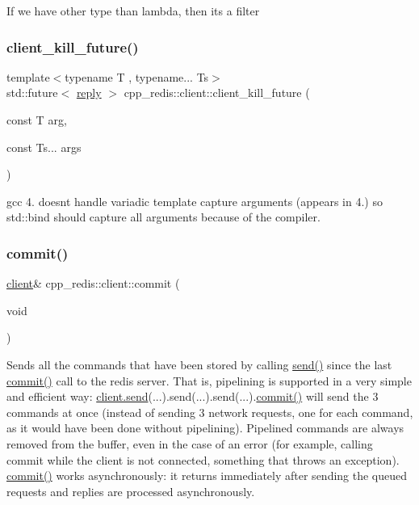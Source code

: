 If we have other type than lambda, then it\textquotesingle{}s a filter \mbox{\label{classcpp__redis_1_1client_ae6f09b6c022c910b79fb90a47291f511}} 
\subsubsection{\texorpdfstring{client\+\_\+kill\+\_\+future()}{client\_kill\_future()}}
{\footnotesize\ttfamily template$<$typename T , typename... Ts$>$ \\
std\+::future$<$ \hyperlink{classcpp__redis_1_1reply}{reply} $>$ cpp\+\_\+redis\+::client\+::client\+\_\+kill\+\_\+future (\begin{DoxyParamCaption}\item[{const T}]{arg,  }\item[{const Ts...}]{args }\end{DoxyParamCaption})}

gcc 4. doesn\textquotesingle{}t handle variadic template capture arguments (appears in 4.) so std\+::bind should capture all arguments because of the compiler. \mbox{\label{classcpp__redis_1_1client_a36a48d61a4900e88fd67795ca59cbea3}} 
\subsubsection{\texorpdfstring{commit()}{commit()}}
{\footnotesize\ttfamily \hyperlink{classcpp__redis_1_1client}{client}\& cpp\+\_\+redis\+::client\+::commit (\begin{DoxyParamCaption}\item[{void}]{ }\end{DoxyParamCaption})}

Sends all the commands that have been stored by calling \hyperlink{classcpp__redis_1_1client_a490ef812b666e6d845fcacc808b87bc1}{send()} since the last \hyperlink{classcpp__redis_1_1client_a36a48d61a4900e88fd67795ca59cbea3}{commit()} call to the redis server. That is, pipelining is supported in a very simple and efficient way\+: \hyperlink{classcpp__redis_1_1client_a490ef812b666e6d845fcacc808b87bc1}{client.\+send}(...).send(...).send(...).\hyperlink{classcpp__redis_1_1client_a36a48d61a4900e88fd67795ca59cbea3}{commit()} will send the 3 commands at once (instead of sending 3 network requests, one for each command, as it would have been done without pipelining). Pipelined commands are always removed from the buffer, even in the case of an error (for example, calling commit while the client is not connected, something that throws an exception). \hyperlink{classcpp__redis_1_1client_a36a48d61a4900e88fd67795ca59cbea3}{commit()} works asynchronously\+: it returns immediately after sending the queued requests and replies are processed asynchronously.

